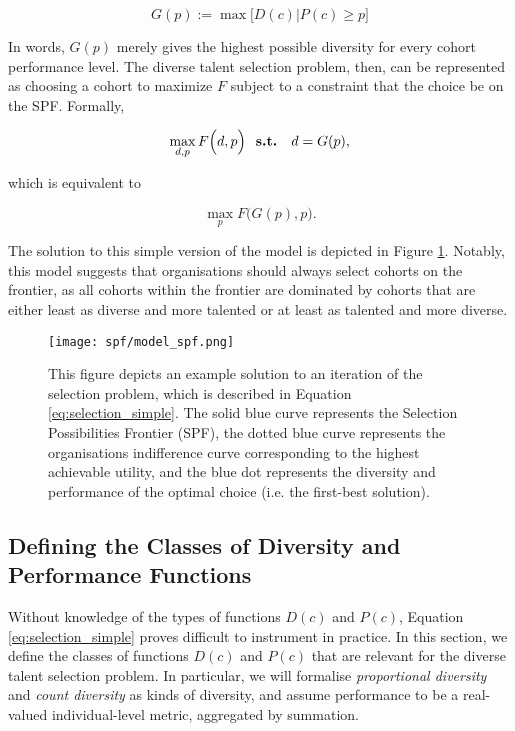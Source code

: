 \begin{equation}
G(p) := \max\Big[D(c)|P(c) \geq p\Big]
\end{equation}

\noindent In words, $G(p)$ merely gives the highest possible diversity for every cohort performance level. The diverse talent selection problem, then, can be represented as choosing a cohort to maximize $F$ subject to a constraint that the choice be on the SPF. Formally, 

\begin{equation}
\max_{d,p} F\Big(d,p\Big) \text{ \bf{ s.t. } } d = G(p), \nonumber 
\end{equation}

\noindent which is equivalent to

\begin{equation}
\max_{p} F\Big(G(p) ,p\Big). \label{eq:selection_simple}
\end{equation}

The solution to this simple version of the model is depicted in Figure \ref{fig:model_spf}. Notably, this model suggests that organisations should always select cohorts on the frontier, as all cohorts within the frontier are dominated by cohorts that are either least as diverse and more talented or at least as talented and more diverse.

\begin{figure}[htbp]
    \centering
    \caption{This figure depicts an example solution to an iteration of the selection problem, which is described in Equation \ref{eq:selection_simple}. The solid blue curve represents the Selection Possibilities Frontier (SPF), the dotted blue curve represents the organisations indifference curve corresponding to the highest achievable utility, and the blue dot represents the diversity and performance of the optimal choice (i.e. the first-best solution). }
    \label{fig:model_spf}
    \texttt{[image: spf/model\_spf.png]} 
\end{figure}

\subsection{Defining the Classes of Diversity and Performance Functions}\label{subsubsec:div_talent_def}
Without knowledge of the types of functions $D(c)$ and $P(c)$, Equation \ref{eq:selection_simple} proves difficult to instrument in practice. In this section, we define the classes of functions $D(c)$ and $P(c)$ that are relevant for the diverse talent selection problem. In particular, we will formalise \emph{proportional diversity} and \emph{count diversity} as kinds of diversity, and assume performance to be a real-valued individual-level metric, aggregated by summation.

